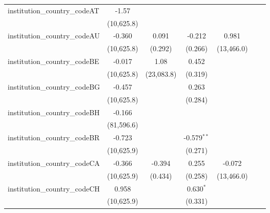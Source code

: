 \begin{tabular}{lcccccc}
   institution\_country\_codeAT          & -1.57         &               &               &             &               &   \\   
                                         & (10,625.8)    &               &               &             &               &   \\   
   institution\_country\_codeAU          & -0.360        & 0.091         & -0.212        & 0.981       &               &   \\   
                                         & (10,625.8)    & (0.292)       & (0.266)       & (13,466.0)  &               &   \\   
   institution\_country\_codeBE          & -0.017        & 1.08          & 0.452         &             &               &   \\   
                                         & (10,625.8)    & (23,083.8)    & (0.319)       &             &               &   \\   
   institution\_country\_codeBG          & -0.457        &               & 0.263         &             &               &   \\   
                                         & (10,625.8)    &               & (0.284)       &             &               &   \\   
   institution\_country\_codeBH          & -0.166        &               &               &             &               &   \\   
                                         & (81,596.6)    &               &               &             &               &   \\   
   institution\_country\_codeBR          & -0.723        &               & -0.579$^{**}$ &             &               &   \\   
                                         & (10,625.9)    &               & (0.271)       &             &               &   \\   
   institution\_country\_codeCA          & -0.366        & -0.394        & 0.255         & -0.072      &               &   \\   
                                         & (10,625.9)    & (0.434)       & (0.258)       & (13,466.0)  &               &   \\   
   institution\_country\_codeCH          & 0.958         &               & 0.630$^{*}$   &             &               &   \\   
                                         & (10,625.9)    &               & (0.331)       &             &               &   \\   

\end{tabular}
